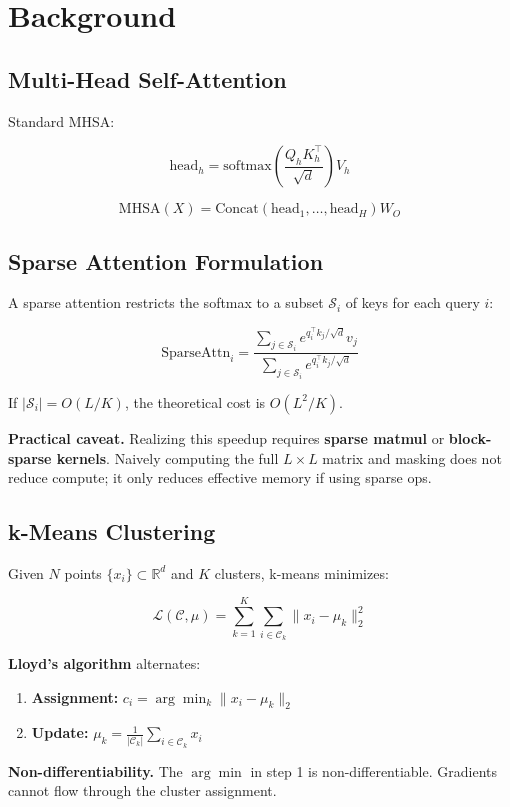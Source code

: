 
\section{Background}

\subsection{Multi-Head Self-Attention}

Standard MHSA:

\[
\text{head}_h = \text{softmax}\!\left(\frac{Q_h K_h^\top}{\sqrt{d}}\right) V_h
\tag{3.1}
\]

\[
\text{MHSA}(X) = \text{Concat}(\text{head}_1, \dots, \text{head}_H) W_O
\tag{3.2}
\]

\subsection{Sparse Attention Formulation}

A sparse attention restricts the softmax to a subset $\mathcal{S}_i$ of keys 
for each query $i$:

\[
\text{SparseAttn}_i = \frac{\sum_{j \in \mathcal{S}_i} e^{q_i^\top k_j / \sqrt{d}} v_j}{\sum_{j \in \mathcal{S}_i} e^{q_i^\top k_j / \sqrt{d}}}
\tag{3.3}
\]

If $|\mathcal{S}_i| = O(L/K)$, the theoretical cost is $O(L^2/K)$.

\textbf{Practical caveat.} Realizing this speedup requires \textbf{sparse matmul} or 
\textbf{block-sparse kernels}. Naively computing the full $L \times L$ matrix and 
masking does not reduce compute; it only reduces effective memory if using 
sparse ops.

\subsection{k-Means Clustering}

Given $N$ points $\{x_i\} \subset \mathbb{R}^d$ and $K$ clusters, k-means 
minimizes:

\[
\mathcal{L}(\mathcal{C}, \mu) = \sum_{k=1}^{K} \sum_{i \in \mathcal{C}_k} \|x_i - \mu_k\|_2^2
\tag{3.4}
\]

\textbf{Lloyd's algorithm} alternates:

\begin{enumerate}
\item \textbf{Assignment:} $c_i = \arg\min_k \|x_i - \mu_k\|_2$
\item \textbf{Update:} $\mu_k = \frac{1}{|\mathcal{C}_k|} \sum_{i \in \mathcal{C}_k} x_i$

\end{enumerate}
\textbf{Non-differentiability.} The $\arg\min$ in step 1 is non-differentiable. 
Gradients cannot flow through the cluster assignment.

